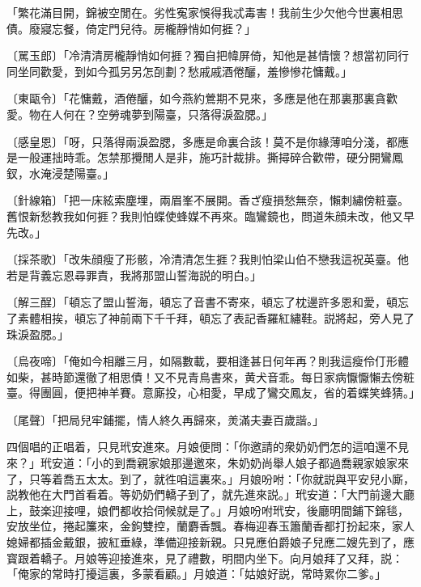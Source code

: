 \begin{myquote}
「繁花滿目開，錦被空閒在。劣性寃家悞得我忒毒害！我前生少欠他今世裏相思債。廢寢忘餐，倚定門兒待。房櫳靜悄如何捱？」

{\markfont〔駡玉郎〕}「冷清清房櫳靜悄如何捱？獨自把幃屏倚，知他是甚情懷？想當初同行同坐同歡愛，到如今孤另另怎㓦劃？愁戚戚酒倦釃，羞慘慘花慵戴。」

{\markfont〔東甌令〕}「花慵戴，酒倦釃，如今燕約鶯期不見來，多應是他在那裏那裏貪歡愛。物在人何在？空勞魂夢到陽臺，只落得淚盈腮。」

{\markfont〔感皇恩〕}「呀，只落得兩淚盈腮，多應是命裏合該！莫不是你緣薄咱分淺，都應是一般運拙時乖。怎禁那攪閒人是非，施巧計裁排。撕撏碎合歡帶，硬分開鸞鳳釵，水淹浸楚陽臺。」

{\markfont〔針線箱〕}「把一床絃索塵埋，兩眉峯不展開。香ざ瘦損愁無奈，懶刺繡傍粧臺。舊恨新愁教我如何捱？我則怕蝶使蜂媒不再來。臨鸞鏡也，問道朱顔未改，他又早先改。」

{\markfont〔採茶歌〕}「改朱顔瘦了形骸，冷清清怎生捱？我則怕梁山伯不戀我這祝英臺。他若是背義忘恩尋罪責，我將那盟山誓海説的明白。」

{\markfont〔解三酲〕}「頓忘了盟山誓海，頓忘了音書不寄來，頓忘了枕邊許多恩和愛，頓忘了素體相挨，頓忘了神前兩下千千拜，頓忘了表記香羅紅繡鞋。説將起，旁人見了珠淚盈腮。」

{\markfont〔烏夜啼〕}「俺如今相離三月，如隔數載，要相逢甚日何年再？則我這瘦伶仃形體如柴，甚時節還徹了相思債！又不見青鳥書來，黄犬音乖。每日家病懨懨懶去傍粧臺。得團圓，便把神羊賽。意廝投，心相愛，早成了鸞交鳳友，省的着蝶笑蜂猜。」

{\markfont〔尾聲〕}「把局兒牢鋪擺，情人終久再歸來，羙滿夫妻百歲諧。」
\end{myquote}

四個唱的正唱着，只見玳安進來。月娘便問：「你邀請的衆奶奶們怎的這咱還不見來？」玳安道：「小的到喬親家娘那邊邀來，朱奶奶尚舉人娘子都過喬親家娘家來了，只等着喬五太太。到了，就徃咱這裏來。」月娘吩咐：「你就説與平安兒小廝，説教他在大門首看着。等奶奶們轎子到了，就先進來説。」玳安道：「大門前邊大廳上，鼓楽迎接哩，娘們都收拾伺候就是了。」月娘吩咐玳安，後廳明間鋪下錦毯，安放坐位，捲起簾來，金鉤雙控，蘭麝香飄。春梅迎春玉簫蘭香都打扮起來，家人媳婦都插金戴銀，披紅垂綠，準備迎接新親。只見應伯爵娘子兒應二嫂先到了，應寳跟着轎子。月娘等迎接進來，見了禮數，明間内坐下。向月娘拜了又拜，説：「俺家的常時打擾這裏，多蒙看顧。」月娘道：「姑娘好説，常時累你二爹。」

